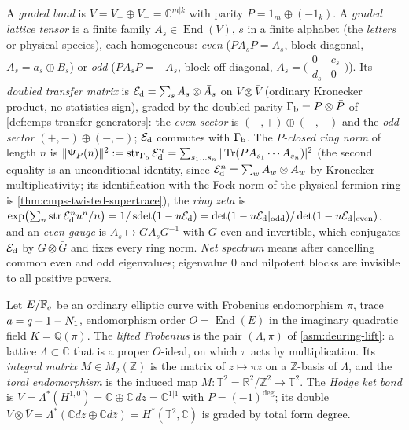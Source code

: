 \begin{definition}
\label{def:graded-lattice-tensor}
A \emph{graded bond} is $V = V_+\oplus V_- = \mathbb C^{m|k}$ with parity $P = 1_m\oplus(-1_k)$.
A \emph{graded lattice tensor} is a finite family $A_s\in\operatorname{End}(V)$, $s$ in a finite
alphabet (the \emph{letters} or physical species), each homogeneous: \emph{even} ($PA_sP = A_s$,
block diagonal, $A_s = a_s\oplus B_s$) or \emph{odd} ($PA_sP = -A_s$, block off-diagonal,
$A_s = \bigl(\begin{smallmatrix}0&c_s\\ d_s&0\end{smallmatrix}\bigr)$). Its \emph{doubled transfer
matrix} is $\mathcal E_{\mathrm d} = \sum_s A_s\otimes\bar A_s$ on $V\otimes\bar V$ (ordinary Kronecker product,
no statistics sign), graded by the doubled parity $\Gamma_{\mathrm b} = P\otimes\bar P$ of
\cref{def:cmps-transfer-generators}: the \emph{even sector} is $(+,+)\oplus(-,-)$ and the
\emph{odd sector} $(+,-)\oplus(-,+)$; $\mathcal E_{\mathrm d}$ commutes with $\Gamma_{\mathrm b}$. The \emph{$P$-closed ring norm}
of length $n$ is $\|\Psi_P(n)\|^2 := \operatorname{str}_{\Gamma_{\mathrm b}}\mathcal E_{\mathrm d}^n = \sum_{s_1\dots s_n}|\operatorname{Tr}(PA_{s_1}\cdots
A_{s_n})|^2$ (the second equality is an unconditional identity, since $\mathcal E_{\mathrm d}^n = \sum_wA_w\otimes\bar A_w$ by
Kronecker multiplicativity; its identification with the Fock norm of the physical fermion ring
is \cref{thm:cmps-twisted-supertrace}), the
\emph{ring zeta} is $\exp\bigl(\sum_n\operatorname{str}\mathcal E_{\mathrm d}^nu^n/n\bigr) = 1/\operatorname{sdet}(1-u\mathcal E_{\mathrm d}) =
\det(1-u\mathcal E_{\mathrm d}|_{\mathrm{odd}})/\det(1-u\mathcal E_{\mathrm d}|_{\mathrm{even}})$, and an \emph{even gauge}
is $A_s\mapsto GA_sG^{-1}$ with $G$ even and invertible, which conjugates $\mathcal E_{\mathrm d}$ by
$G\otimes\bar G$ and fixes every ring norm. \emph{Net spectrum} means after cancelling common
even and odd eigenvalues; eigenvalue $0$ and nilpotent blocks are invisible to all positive
powers.
\end{definition}

\begin{definition}
\label{def:lifted-frobenius-torus}
Let $E/\mathbb F_q$ be an ordinary elliptic curve with Frobenius endomorphism $\pi$, trace
$a = q+1-N_{1}$, endomorphism order $O = \operatorname{End}(E)$ in the imaginary
quadratic field $K = \mathbb Q(\pi)$. The \emph{lifted Frobenius} is the pair $(\Lambda,\pi)$ of %
\cref{asm:deuring-lift}: a lattice $\Lambda\subset\mathbb C$ that is a proper $O$-ideal, on %
which $\pi$ acts by multiplication. Its \emph{integral matrix} $M\in M_2(\mathbb Z)$ is the matrix
of $z\mapsto\pi z$ on a $\mathbb Z$-basis of $\Lambda$, and the \emph{toral endomorphism} is the %
induced map $M\colon\mathbb T^2 = \mathbb R^2/\mathbb Z^2\to\mathbb T^2$. The \emph{Hodge ket bond}
is $V = \Lambda^*(H^{1,0}) = \mathbb C\oplus\mathbb C\,dz = \mathbb C^{1|1}$ with $P = (-1)^{\deg}$; %
its double $V\otimes\bar V = \Lambda^*(\mathbb C dz\oplus\mathbb C d\bar z) = H^*(\mathbb T^2,\mathbb C)$ %
is graded by total form degree.
\end{definition}

